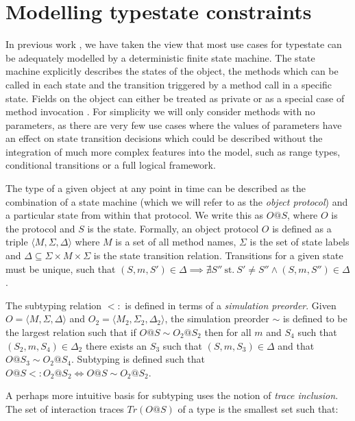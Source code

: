 \documentclass[preprint]{sigplanconf}
\newcommand{\Tr}{\mathit{Tr}}
\begin{document}
\section{Modelling typestate constraints}
\label{sec:tsmodel}

In previous work \cite{McGinniss2011}, we have taken the view that most use 
cases for typestate can be adequately modelled by a deterministic
finite state machine. The state machine explicitly describes the
states of the object, the methods which can be called in each state and
the transition triggered by a method call in a specific state.
Fields on the object can either be treated as private or as a special case
of method invocation \cite{Abadi1996}. For simplicity
we will only consider methods with no parameters, as there are very few
use cases where the values of parameters have an effect on state transition 
decisions which could be described without the integration of much more
complex features into the model, such as range types, conditional transitions
or a full logical framework.

The type of a given object at any point in time can be described as the
combination of a state machine (which we will refer to as the 
{\it object protocol}) and a particular state from within that protocol.
We write this as $O@S$, where $O$ is the protocol and $S$ is the state.
Formally, an object protocol $O$ is defined as a triple
$\langle M, \Sigma, \Delta \rangle$ where $M$ is a set of all
method names, $\Sigma$ is the set of state labels and
$\Delta \subseteq \Sigma \times M \times \Sigma$ is the state
transition relation. Transitions for a given state must be unique, such that 
$(S, m, S') \in \Delta \implies \nexists S'' \:\mathrm{st.}\: S' \neq S'' 
\wedge (S, m, S'') \in \Delta$.

The subtyping relation $<:$ is defined in terms of a
{\it simulation preorder}. Given $O = \langle M, \Sigma, \Delta \rangle$ and
$O_2 = \langle M_2, \Sigma_2, \Delta_2 \rangle$, the simulation preorder
$\sim$
is defined to be the largest relation such that if $O@S \sim O_2@S_2$ then for all
$m$ and $S_4$ such that $(S_2, m, S_4) \in \Delta_2$ there exists an $S_3$ such that
$(S, m, S_3) \in \Delta$ and that $O@S_3 \sim O_2@S_4$.
Subtyping is defined such that $O@S <: O_2@S_2 \iff O@S \sim O_2@S_2$.

A perhaps more intuitive basis for subtyping
uses the notion of {\it trace inclusion}. The set of interaction traces 
$\Tr(O@S)$ of a type is the smallest set such that:
\end{document}
